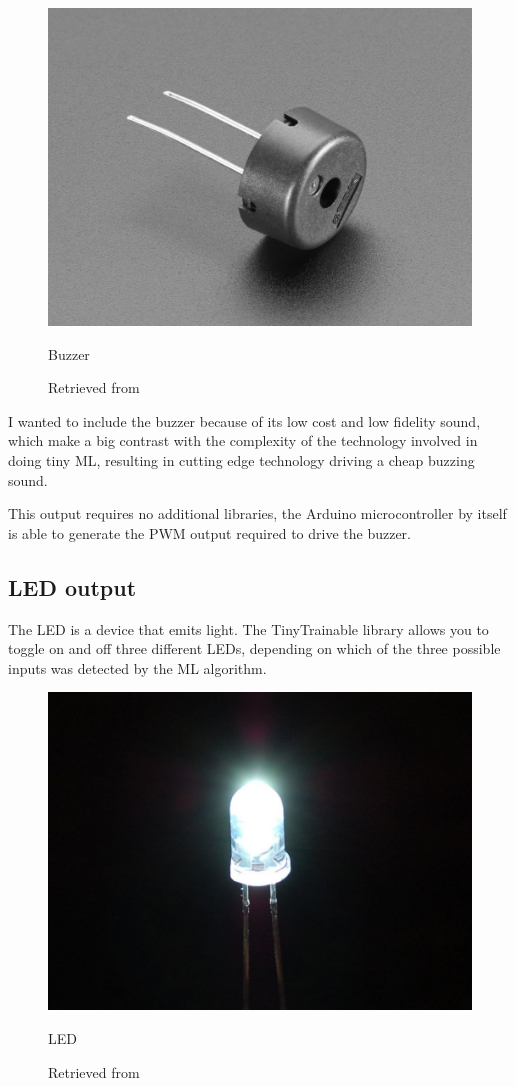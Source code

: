 \begin{figure}[ht]
  \centering
  \includegraphics[width=0.75\linewidth,height=0.25\textheight,keepaspectratio]{images/materials-adafruit-buzzer.jpg}
  \caption{Buzzer}
  \caption*{Retrieved from \cite{website-materials-adafruit-buzzer}}
  \label{fig:materials-adafruit-buzzer}
\end{figure}

I wanted to include the buzzer because of its low cost and low fidelity sound, which make a big contrast with the complexity of the technology involved in doing tiny \acrshort{ML}, resulting in cutting edge technology driving a cheap buzzing sound. 

This output requires no additional libraries, the Arduino microcontroller by itself is able to generate the \acrfull{PWM} output required to drive the buzzer.

\subsection{LED output}

The \acrshort{LED} is a device that emits light. The TinyTrainable library allows you to toggle on and off three different LEDs, depending on which of the three possible inputs was detected by the \acrshort{ML} algorithm.

\begin{figure}[ht]
  \centering
  \includegraphics[width=0.75\linewidth,height=0.25\textheight,keepaspectratio]{images/materials-adafruit-led.jpg}
  \caption{LED}
  \caption*{Retrieved from \cite{website-materials-adafruit-led}}
  \label{fig:materials-adafruit-led}
\end{figure}


